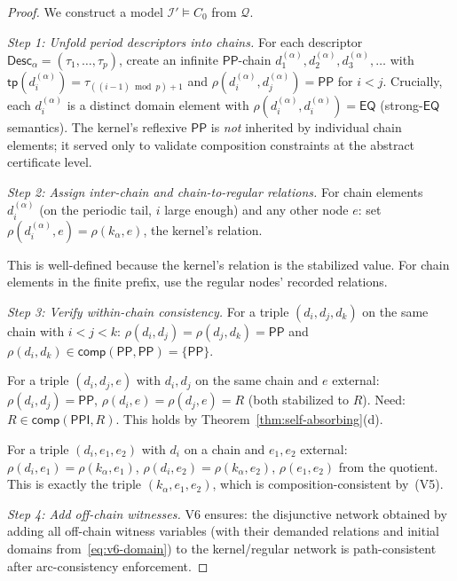 \documentclass[a4paper,11pt]{article}
\theoremstyle{definition}
\newcommand{\EQ}{\ensuremath{\mathsf{EQ}}}
\newcommand{\PP}{\ensuremath{\mathsf{PP}}}
\newcommand{\PPI}{\ensuremath{\mathsf{PPI}}}
\newcommand{\comp}{\ensuremath{\mathsf{comp}}}
\newcommand{\tp}{\ensuremath{\mathsf{tp}}}
\newcommand{\Desc}{\ensuremath{\mathsf{Desc}}}
\newcommand{\interp}{\ensuremath{\mathcal{I}}}
\begin{document}
\begin{proof}
We construct a model $\interp' \models C_0$ from $\mathcal{Q}$.

\medskip\noindent\textit{Step 1: Unfold period descriptors into
chains.}\;
For each descriptor $\Desc_\alpha = (\tau_1, \ldots, \tau_p)$,
create an infinite $\PP$-chain
$d_1^{(\alpha)}, d_2^{(\alpha)}, d_3^{(\alpha)}, \ldots$ with
$\tp(d_i^{(\alpha)}) = \tau_{((i-1) \bmod p) + 1}$ and
$\rho(d_i^{(\alpha)}, d_j^{(\alpha)}) = \PP$ for $i < j$.
Crucially, each $d_i^{(\alpha)}$ is a distinct domain element with
$\rho(d_i^{(\alpha)}, d_i^{(\alpha)}) = \EQ$ (strong-$\EQ$
semantics).  The kernel's reflexive $\PP$ is \emph{not} inherited by
individual chain elements; it served only to validate composition
constraints at the abstract certificate level.

\medskip\noindent\textit{Step 2: Assign inter-chain and
chain-to-regular relations.}\;
For chain elements $d_i^{(\alpha)}$ (on the periodic tail, $i$
large enough) and any other node $e$: set
$\rho(d_i^{(\alpha)}, e) = \rho(k_\alpha, e)$, the kernel's
relation.

This is well-defined because the kernel's relation is the stabilized
value.  For chain elements in the finite prefix, use the regular
nodes' recorded relations.

\medskip\noindent\textit{Step 3: Verify within-chain
consistency.}\;
For a triple $(d_i, d_j, d_k)$ on the same chain with $i < j < k$:
$\rho(d_i, d_j) = \rho(d_j, d_k) = \PP$ and $\rho(d_i, d_k)
\in \comp(\PP, \PP) = \{\PP\}$. \checkmark

For a triple $(d_i, d_j, e)$ with $d_i, d_j$ on the same chain and
$e$ external: $\rho(d_i, d_j) = \PP$, $\rho(d_i, e) =
\rho(d_j, e) = R$ (both stabilized to $R$).  Need:
$R \in \comp(\PPI, R)$.  This holds by
Theorem~\ref{thm:self-absorbing}(d). \checkmark

For a triple $(d_i, e_1, e_2)$ with $d_i$ on a chain and $e_1, e_2$
external: $\rho(d_i, e_1) = \rho(k_\alpha, e_1)$,
$\rho(d_i, e_2) = \rho(k_\alpha, e_2)$,
$\rho(e_1, e_2)$ from the quotient.  This is exactly the triple
$(k_\alpha, e_1, e_2)$, which is composition-consistent by~(V5).
\checkmark

\medskip\noindent\textit{Step 4: Add off-chain witnesses.}\;
V6 ensures: the disjunctive network obtained by adding all off-chain
witness variables (with their demanded relations and initial domains
from~\eqref{eq:v6-domain})
to the kernel/regular network is path-consistent after arc-consistency
enforcement.


\end{proof}
\end{document}
